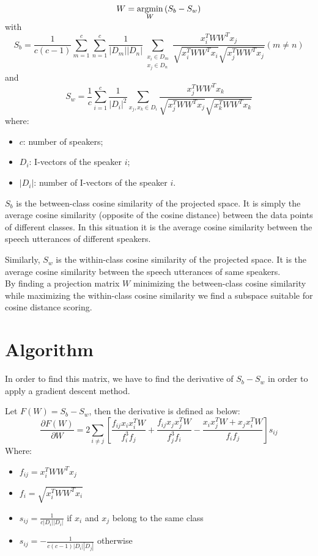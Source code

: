 \documentclass{techrep} %
\begin{document}
$$W = \smash{\mathop{{\rm argmin}}\limits_{W}}\, (S_b - S_w)$$
with
$$S_b =
\frac{1}{c(c-1)}\sum_{m=1}^c\sum_{n=1}^c\frac{1}{|D_m||D_n|}\sum_{\substack{x_i
    \in D_m \\ x_j \in D_n}}
\frac{x_i^TWW^Tx_j}{\sqrt{x_i^TWW^Tx_i}\sqrt{x_j^TWW^Tx_j}} (m \neq
n)$$ and
$$S_w = \frac{1}{c}\sum_{i=1}^c\frac{1}{|D_i|^2}\sum_{x_j,x_k \in D_i}
\frac{x_j^TWW^Tx_k}{\sqrt{x_j^TWW^Tx_j}\sqrt{x_k^TWW^Tx_k}}$$
where:
\begin{itemize}
  \item $c$: number of speakers;
  \item $D_i$: I-vectors of the speaker $i$;
  \item $|D_i|$: number of I-vectors of the speaker $i$.
\end{itemize}

$S_b$ is the between-class cosine similarity of the projected
space. It is simply the average cosine similarity (opposite of the
cosine distance) between the data points of different classes. In this
situation it is the average cosine similarity between the speech
utterances of different speakers.

Similarly, $S_w$ is the within-class cosine similarity of the
projected space. It is the average cosine similarity between the
speech utterances of same speakers.\\
By finding a projection matrix $W$ minimizing the between-class cosine
similarity while maximizing the within-class cosine similarity we find
a subspace suitable for cosine distance scoring.

\section{Algorithm}

In order to find this matrix, we have to find the derivative of $S_b -
S_w$ in order to apply a gradient descent method. %

Let $F(W) = S_b - S_w$, then the derivative is defined as below:
$$\frac{\partial{F(W)}}{\partial{W}} =
2\sum_{i\neq{}j}\left[\frac{f_{ij}x_ix_i^TW}{f_i^3f_j} +
  \frac{f_{ij}x_jx_j^TW}{f_j^3f_i} - \frac{x_ix_j^TW + x_jx_i^TW}{f_if_j}\right]s_{ij}$$
Where:
\begin{itemize}
\item $f_{ij} = x_i^TWW^Tx_j$
\item $f_i = \sqrt{x_i^TWW^Tx_i}$
\item $s_{ij} = \frac{1}{c|D_i||D_i|}$ if $x_i$ and $x_j$ belong to the same class
\item $s_{ij} = -\frac{1}{c(c-1)|D_i||D_j|}$ otherwise
\end{itemize}
\end{document}
